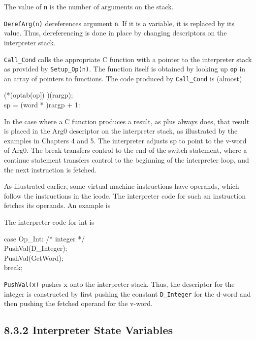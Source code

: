 
The value of \texttt{n} is the number of arguments on the stack.

\texttt{DerefArg(n)} dereferences argument \texttt{n}. If it is a
variable, it is replaced by its value. Thus, dereferencing is done in
place by changing descriptors on the interpreter stack.

\texttt{Call\_Cond} calls the appropriate C function with a pointer to
the interpreter stack as provided by \texttt{Setup\_Op(n)}. The
function itself is obtained by looking up \texttt{op} in an array of
pointers to functions.  The code produced by \texttt{Call\_Cond} is
(almost)

\begin{iconcode}
\>(*(optab(op]) )(rargp);\\
\>sp = (word * )rargp + 1:
\end{iconcode}

In the case where a C function produces a result, as plus always does,
that result is placed in the Arg0 descriptor on the interpreter stack,
as illustrated by the examples in Chapters 4 and 5. The interpreter
adjusts sp to point to the v-word of Arg0. The break transfers control
to the end of the switch statement, where a continue statement
transfers control to the beginning of the interpreter loop, and the
next instruction is fetched.

As illustrated earlier, some virtual machine instructions have
operands, which follow the instructions in the icode. The interpreter
code for such an instruction fetches its operands. An example is


The interpreter code for int is

\begin{iconcode}
\>case Op\_Int: /* integer */\\
\>PushVal(D\_Integer);\\
\>PushVal(GetWord);\\
\>break;
\end{iconcode}

\texttt{PushVal(x)} pushes x onto the interpreter stack. Thus, the descriptor
for the integer is constructed by first pushing the constant \texttt{D\_Integer}
for the d-word and then pushing the fetched operand for the v-word.

\subsection[8.3.2 Interpreter State Variables]{8.3.2 Interpreter State Variables}

